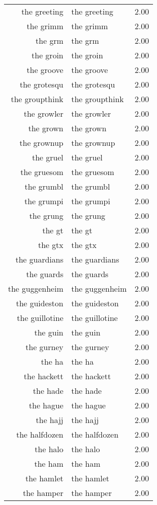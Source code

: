 \begin{table}[ht]
\begin{tabular}{rlr}
  the greeting & the greeting & 2.00 \\ 
  the grimm & the grimm & 2.00 \\ 
  the grm & the grm & 2.00 \\ 
  the groin & the groin & 2.00 \\ 
  the groove & the groove & 2.00 \\ 
  the grotesqu & the grotesqu & 2.00 \\ 
  the groupthink & the groupthink & 2.00 \\ 
  the growler & the growler & 2.00 \\ 
  the grown & the grown & 2.00 \\ 
  the grownup & the grownup & 2.00 \\ 
  the gruel & the gruel & 2.00 \\ 
  the gruesom & the gruesom & 2.00 \\ 
  the grumbl & the grumbl & 2.00 \\ 
  the grumpi & the grumpi & 2.00 \\ 
  the grung & the grung & 2.00 \\ 
  the gt & the gt & 2.00 \\ 
  the gtx & the gtx & 2.00 \\ 
  the guardians & the guardians & 2.00 \\ 
  the guards & the guards & 2.00 \\ 
  the guggenheim & the guggenheim & 2.00 \\ 
  the guideston & the guideston & 2.00 \\ 
  the guillotine & the guillotine & 2.00 \\ 
  the guin & the guin & 2.00 \\ 
  the gurney & the gurney & 2.00 \\ 
  the ha & the ha & 2.00 \\ 
  the hackett & the hackett & 2.00 \\ 
  the hade & the hade & 2.00 \\ 
  the hague & the hague & 2.00 \\ 
  the hajj & the hajj & 2.00 \\ 
  the halfdozen & the halfdozen & 2.00 \\ 
  the halo & the halo & 2.00 \\ 
  the ham & the ham & 2.00 \\ 
  the hamlet & the hamlet & 2.00 \\ 
  the hamper & the hamper & 2.00 \\ 

\end{tabular}
\end{table}
